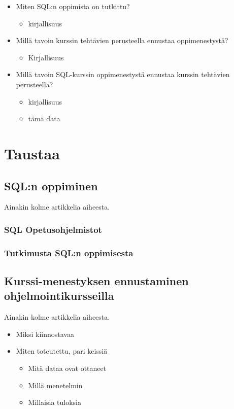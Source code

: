 \documentclass[finnish,twoside,openright]{HYgraduMLDS}
\begin{document}
\begin{itemize}
    \item Miten SQL:n oppimista on tutkittu?
    \begin{itemize}
        \item kirjallisuus
    \end{itemize}
    \item Millä tavoin kurssin tehtävien perusteella ennustaa oppimenestystä?
    \begin{itemize}
        \item Kirjallisuus
    \end{itemize}
    \item Millä tavoin SQL-kurssin oppimenestystä ennustaa kurssin tehtävien perusteella?
    \begin{itemize}
        \item kirjallisuus
        \item tämä data
    \end{itemize}
\end{itemize}


\chapter{Taustaa}

\section{SQL:n oppiminen}

Ainakin kolme artikkelia aiheesta.

\subsection{SQL Opetusohjelmistot}


\subsection{Tutkimusta SQL:n oppimisesta}


\section{Kurssi-menestyksen ennustaminen ohjelmointikursseilla}

Ainakin kolme artikkelia aiheesta.

\begin{itemize}
    \item Miksi kiinnostavaa
    \item Miten toteutettu, pari keissiä
    \begin{itemize}
        \item Mitä dataa ovat ottaneet
        \item Millä menetelmin
        \item Millaisia tuloksia
    \end{itemize}
\end{itemize}
\end{document}
